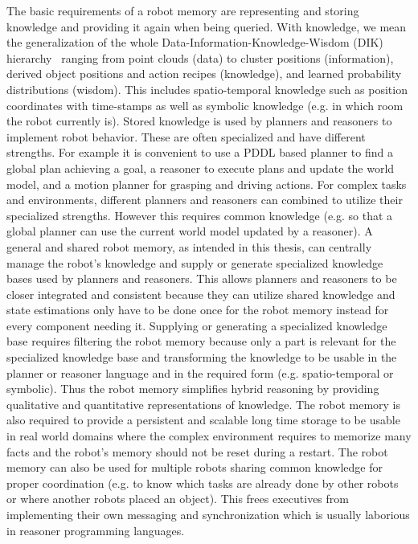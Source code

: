 \documentclass[a4paper,11pt]{article}
\begin{document}
The basic requirements of a robot memory are representing and storing
knowledge and providing it again when being queried. With knowledge,
we mean the generalization of the whole
Data-Information-Knowledge-Wisdom (DIK) hierarchy~\cite{DIKW} ranging
from point clouds (data) to cluster positions (information), derived
object positions and action recipes (knowledge), and learned
probability distributions (wisdom). This includes spatio-temporal
knowledge such as position coordinates with time-stamps as well as
symbolic knowledge (e.g. in which room the robot currently is). Stored
knowledge is used by planners and reasoners to implement robot
behavior. These are often specialized and have different
strengths. For example it is convenient to use a PDDL based planner to
find a global plan achieving a goal, a reasoner to execute plans and
update the world model, and a motion planner for grasping and driving
actions. For complex tasks and environments, different planners and
reasoners can combined to utilize their specialized strengths. However
this requires common knowledge (e.g. so that a global planner can use
the current world model updated by a reasoner).
%
A general and shared robot memory, as intended in this thesis, can
centrally manage the robot's knowledge and supply or generate
specialized knowledge bases used by planners and reasoners. This
allows planners and reasoners to be closer integrated and consistent
because they can utilize shared knowledge and state estimations only
have to be done once for the robot memory instead for every component
needing it. Supplying or generating a specialized knowledge base
requires filtering the robot memory because only a part is relevant
for the specialized knowledge base and transforming the knowledge to
be usable in the planner or reasoner language and in the required form
(e.g. spatio-temporal or symbolic). Thus the robot memory simplifies
hybrid reasoning by providing qualitative and quantitative
representations of knowledge. The robot memory is also required to
provide a persistent and scalable long time storage to be usable in
real world domains where the complex environment requires to memorize
many facts and the robot's memory should not be reset during a
restart.
%
The robot memory can also be used for multiple robots sharing common
knowledge for proper coordination (e.g. to know which tasks are
already done by other robots or where another robots placed an
object). This frees executives from implementing their own messaging
and synchronization which is usually laborious in reasoner programming
languages.
\end{document}
